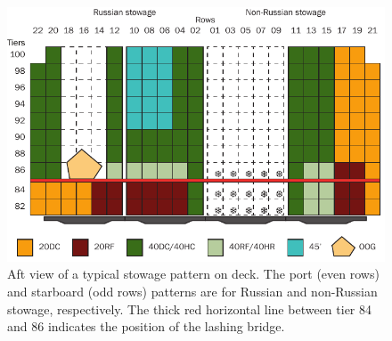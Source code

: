 \documentclass[runningheads]{llncs}
\begin{document}
\begin{figure}[h!]
  \centering
  \includegraphics{figures/3_40}
  \caption{Aft view of a typical stowage pattern on deck. The port (even rows) and starboard (odd rows) patterns are for Russian and non-Russian stowage, respectively. The thick red horizontal line between tier 84 and 86 indicates the position of the lashing bridge.}\label{fig:ObjectivesOnDeck}
\end{figure}
\end{document}
